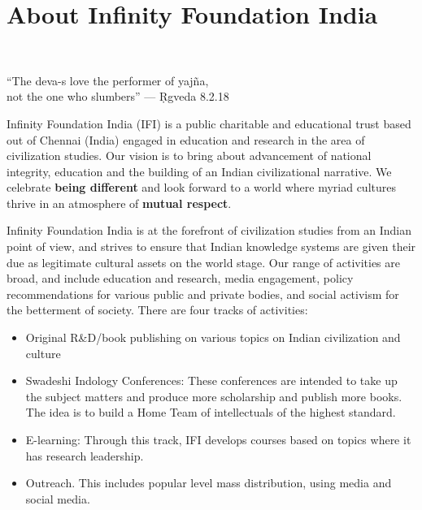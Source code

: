 \chapter*{About Infinity Foundation India}\label{preface4}

\vspace{-.7cm}

\begin{center}
 \\
\end{center}

\begin{center}
“The deva-s love the performer of yajña,\\
not the one who slumbers” — Ṛgveda 8.2.18
\end{center}


Infinity Foundation India (IFI) is a public charitable and educational trust based out of Chennai (India) engaged in education and research in the area of civilization studies. Our vision is to bring about advancement of national integrity, education and the building of an Indian civilizational narrative. We celebrate \textbf{being different} and look forward to a world where myriad cultures thrive in an atmosphere of \textbf{mutual respect}. 

Infinity Foundation India is at the forefront of civilization studies from an Indian point of view, and strives to ensure that Indian knowledge systems are given their due as legitimate cultural assets on the world stage. Our range of activities are broad, and include education and research, media engagement, policy recommendations for various public and private bodies, and social activism for the betterment of society. There are four tracks of activities:

\begin{itemize}
\itemsep=0pt
\item Original R\&D/book publishing on various topics on Indian civilization and culture

\item Swadeshi Indology Conferences: These conferences are intended to take up the subject matters and produce more scholarship and publish more books. The idea is to build a Home Team of intellectuals of the highest standard.

\item E-learning: Through this track, IFI develops courses based on topics where it has research leadership.

\item Outreach. This includes popular level mass distribution, using media and social media.

\end{itemize}

